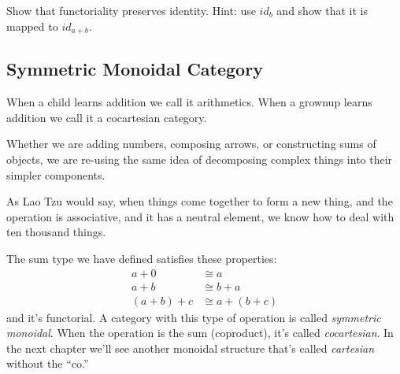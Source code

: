 \documentclass[DaoFP]{subfiles}
\begin{document}
\begin{exercise}
Show that functoriality preserves identity. Hint: use $id_b$ and show that it is mapped to $id_{a+b}$.
\end{exercise}

\subsection{Symmetric Monoidal Category}
When a child learns addition we call it arithmetics. When a grownup learns addition we call it a cocartesian category.

Whether we are adding numbers, composing arrows, or constructing sums of objects, we are re-using the same idea of decomposing complex things into their simpler components.  

As Lao Tzu would say, when things come together to form a new thing, and the operation is associative, and it has a neutral element, we know how to deal with ten thousand things.

The sum type we have defined satisfies these properties:
\begin{align*}
a + 0 &\cong a \\
a + b &\cong b + a \\
(a + b) + c &\cong a + (b + c)
\end{align*}
and it's functorial. A category with this type of operation is called \emph{symmetric monoidal}. When the operation is the sum (coproduct), it's called \emph{cocartesian}. In the next chapter we'll see another monoidal structure that's called \emph{cartesian} without the ``co.''
\end{document}
